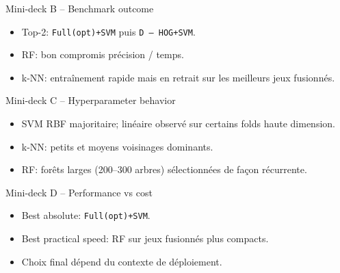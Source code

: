 \documentclass[aspectratio=169]{beamer}
\begin{document}
\begin{frame}{Mini-deck B -- Benchmark outcome}
\begin{itemize}
  \item Top-2: \texttt{Full(opt)+SVM} puis \texttt{D -- HOG+SVM}.
  \item RF: bon compromis précision / temps.
  \item k-NN: entraînement rapide mais en retrait sur les meilleurs jeux fusionnés.
\end{itemize}
\end{frame}

\begin{frame}{Mini-deck C -- Hyperparameter behavior}
\begin{itemize}
  \item SVM RBF majoritaire; linéaire observé sur certains folds haute dimension.
  \item k-NN: petits et moyens voisinages dominants.
  \item RF: forêts larges (200--300 arbres) sélectionnées de façon récurrente.
\end{itemize}
\end{frame}

\begin{frame}{Mini-deck D -- Performance vs cost}
\begin{itemize}
  \item Best absolute: \texttt{Full(opt)+SVM}.
  \item Best practical speed: RF sur jeux fusionnés plus compacts.
  \item Choix final dépend du contexte de déploiement.
\end{itemize}
\end{frame}
\end{document}
